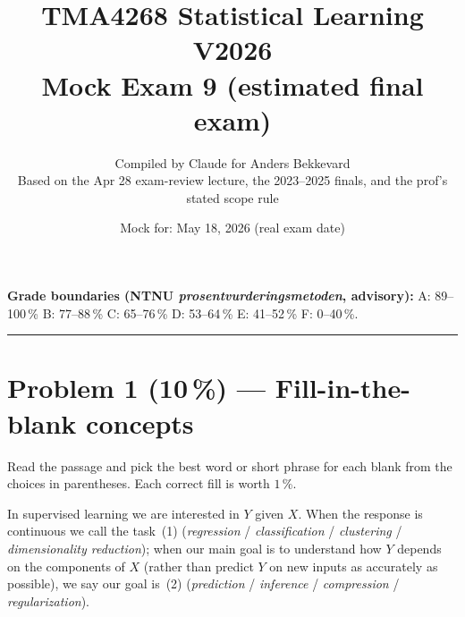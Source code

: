 \documentclass[11pt,a4paper]{article}
\title{TMA4268 Statistical Learning V2026\\[0.3em]
\large Mock Exam 9 (estimated final exam)}
\author{Compiled by Claude for Anders Bekkevard\\[0.2em]
\small Based on the Apr 28 exam-review lecture, the 2023--2025 finals, and the prof's stated scope rule}
\date{Mock for: May 18, 2026 (real exam date)}
\newcommand{\points}[1]{\textbf{(#1\,\%)}}
\begin{document}
\maketitle

\noindent{}

\vspace{0.6em}
\noindent\textbf{Grade boundaries (NTNU \emph{prosentvurderingsmetoden}, advisory):}
A: 89--100\,\% \quad B: 77--88\,\% \quad C: 65--76\,\% \quad D: 53--64\,\% \quad E: 41--52\,\% \quad F: 0--40\,\%.

\vspace{1em}
\hrule
\vspace{1em}

\section*{Problem 1 \points{10} --- Fill-in-the-blank concepts}

\noindent Read the passage and pick the best word or short phrase for each blank from the choices in parentheses. Each correct fill is worth $1$\,\%.

\bigskip

In supervised learning we are interested in $Y$ given $X$. When the response is continuous we call the task \underline{\hspace{2.5cm}}\,(1) (\emph{regression} / \emph{classification} / \emph{clustering} / \emph{dimensionality reduction}); when our main goal is to understand how $Y$ depends on the components of $X$ (rather than predict $Y$ on new inputs as accurately as possible), we say our goal is \underline{\hspace{2.5cm}}\,(2) (\emph{prediction} / \emph{inference} / \emph{compression} / \emph{regularization}).
\end{document}
